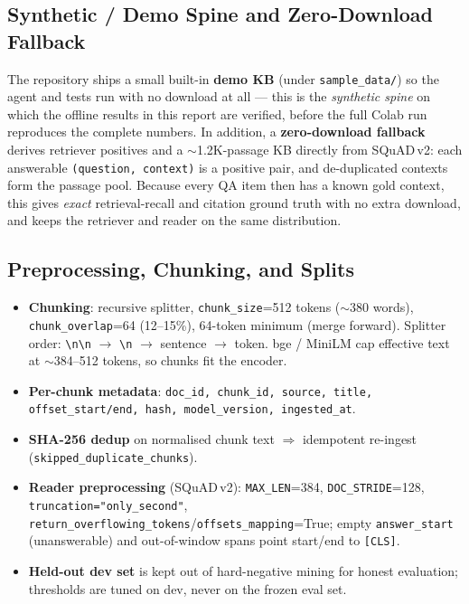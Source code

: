 \documentclass[12pt,a4paper]{article}
\begin{document}
\subsection{Synthetic / Demo Spine and Zero-Download Fallback}

The repository ships a small built-in \textbf{demo KB} (under \texttt{sample\_data/}) so the agent and tests run with no download at all --- this is the \emph{synthetic spine} on which the offline results in this report are verified, before the full Colab run reproduces the complete numbers. In addition, a \textbf{zero-download fallback} derives retriever positives and a $\sim$1.2K-passage KB directly from SQuAD\,v2: each answerable \texttt{(question, context)} is a positive pair, and de-duplicated contexts form the passage pool. Because every QA item then has a known gold context, this gives \emph{exact} retrieval-recall and citation ground truth with no extra download, and keeps the retriever and reader on the same distribution.

\subsection{Preprocessing, Chunking, and Splits}

\begin{itemize}\setlength\itemsep{0.15em}
  \item \textbf{Chunking}: recursive splitter, \texttt{chunk\_size}=512 tokens ($\sim$380 words), \texttt{chunk\_overlap}=64 (12--15\%), 64-token minimum (merge forward). Splitter order: \texttt{\textbackslash n\textbackslash n} $\rightarrow$ \texttt{\textbackslash n} $\rightarrow$ sentence $\rightarrow$ token. bge / MiniLM cap effective text at $\sim$384--512 tokens, so chunks fit the encoder.
  \item \textbf{Per-chunk metadata}: \texttt{doc\_id, chunk\_id, source, title, offset\_start/end, hash, model\_version, ingested\_at}.
  \item \textbf{SHA-256 dedup} on normalised chunk text $\Rightarrow$ idempotent re-ingest (\texttt{skipped\_duplicate\_chunks}).
  \item \textbf{Reader preprocessing} (SQuAD\,v2): \texttt{MAX\_LEN}=384, \texttt{DOC\_STRIDE}=128, \texttt{truncation="only\_second"}, \texttt{return\_overflowing\_tokens}/\texttt{offsets\_mapping}=True; empty \texttt{answer\_start} (unanswerable) and out-of-window spans point start/end to \texttt{[CLS]}.
  \item \textbf{Held-out dev set} is kept out of hard-negative mining for honest evaluation; thresholds are tuned on dev, never on the frozen eval set.
\end{itemize}
\end{document}
